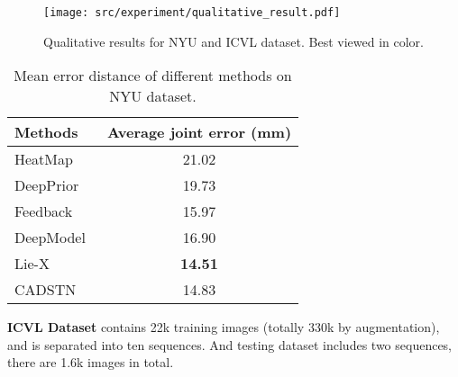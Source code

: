 \documentclass[journal,comsoc]{IEEEtran}
\let\MYoriglatexcaption\caption
\renewcommand{\caption}[2][\relax]{\MYoriglatexcaption[#2]{#2}}
\begin{document}
\begin{figure*}[htbp]\footnotesize
\centering
    \texttt{[image: src/experiment/qualitative\_result.pdf]}
    \caption{Qualitative results for NYU and ICVL dataset. Best viewed in color.}
\label{fig:qualitative results}
\end{figure*}

\begin{table}[htbp]
  \centering
  \caption{Mean error distance of different methods on NYU dataset.}
    \begin{tabular}{|l|c|}
    \hline
    Methods & \multicolumn{1}{l|}{Average joint error (mm)} \\
    \hline
    HeatMap~\cite{tompson2014real} & 21.02 \\
    DeepPrior~\cite{oberweger2015hands} & 19.73 \\
    Feedback~\cite{oberweger2015training} & 15.97 \\
    DeepModel~\cite{zhou2016model} & 16.90 \\
    Lie-X~\cite{xu2017lie} & \textbf{14.51} \\
    CADSTN  & 14.83 \\
    \hline
    \end{tabular}%
  \label{tab:mean error NYU}%
\end{table}%

\textbf{ICVL Dataset} contains 22k training images (totally 330k by augmentation), and is separated into ten sequences. And testing dataset
includes two sequences, there are 1.6k images in total.
\end{document}
